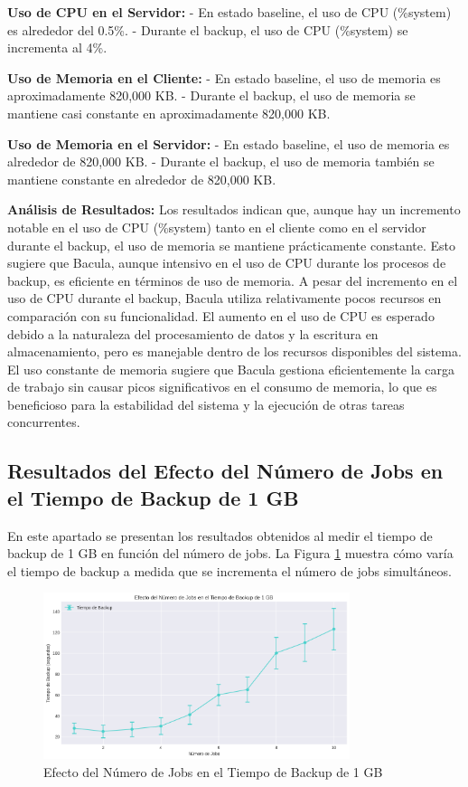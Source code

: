 \textbf{Uso de CPU en el Servidor:}
- En estado baseline, el uso de CPU (\%system) es alrededor del 0.5\%.
- Durante el backup, el uso de CPU (\%system) se incrementa al 4\%.

\textbf{Uso de Memoria en el Cliente:}
- En estado baseline, el uso de memoria es aproximadamente 820,000 KB.
- Durante el backup, el uso de memoria se mantiene casi constante en aproximadamente 820,000 KB.

\textbf{Uso de Memoria en el Servidor:}
- En estado baseline, el uso de memoria es alrededor de 820,000 KB.
- Durante el backup, el uso de memoria también se mantiene constante en alrededor de 820,000 KB.

\textbf{Análisis de Resultados:}
Los resultados indican que, aunque hay un incremento notable en el uso de CPU (\%system) tanto en el cliente como en el servidor durante el backup, el uso de memoria se mantiene prácticamente constante. Esto sugiere que Bacula, aunque intensivo en el uso de CPU durante los procesos de backup, es eficiente en términos de uso de memoria.
\smallskip
A pesar del incremento en el uso de CPU durante el backup, Bacula utiliza relativamente pocos recursos en comparación con su funcionalidad. El aumento en el uso de CPU es esperado debido a la naturaleza del procesamiento de datos y la escritura en almacenamiento, pero es manejable dentro de los recursos disponibles del sistema. El uso constante de memoria sugiere que Bacula gestiona eficientemente la carga de trabajo sin causar picos significativos en el consumo de memoria, lo que es beneficioso para la estabilidad del sistema y la ejecución de otras tareas concurrentes.



\subsection{Resultados del Efecto del Número de Jobs en el Tiempo de Backup de 1 GB}

En este apartado se presentan los resultados obtenidos al medir el tiempo de backup de 1 GB en función del número de jobs. La Figura \ref{fig:efecto-numero-jobs} muestra cómo varía el tiempo de backup a medida que se incrementa el número de jobs simultáneos.

\begin{figure}[H]
    \centering
    \includegraphics[width=0.8\textwidth]{efecto_numero_jobs.png}
    \caption{Efecto del Número de Jobs en el Tiempo de Backup de 1 GB}
    \label{fig:efecto-numero-jobs}
\end{figure}

